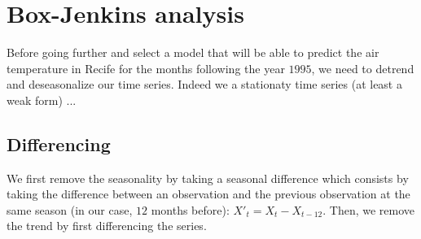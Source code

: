 \section{Box-Jenkins analysis} 

Before going further and select a model that will be able to predict the air temperature in Recife for the months following the year $1995$, we need to detrend and deseasonalize our time series. Indeed we a stationaty time series (at least a weak form) ...


\subsection{Differencing}

We first remove the seasonality by taking a seasonal difference which consists by taking the difference between an observation and the previous observation at the same season (in our case, $12$ months before): $X'_t = X_t - X_{t-12}$. 
Then, we remove the trend by first differencing the series.

